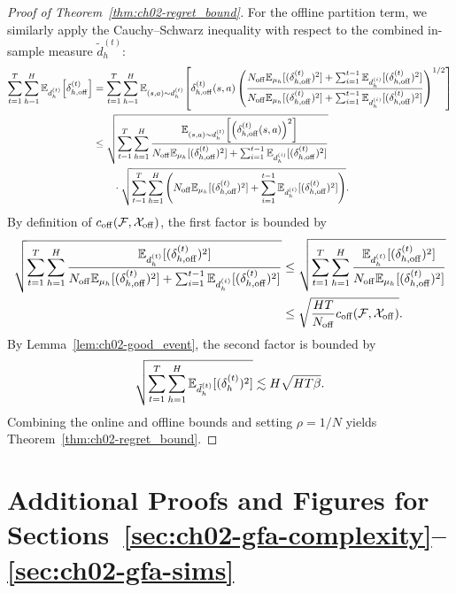 \begin{proof}[Proof of Theorem~\ref{thm:ch02-regret_bound}]
For the offline partition term, we similarly apply the Cauchy--Schwarz inequality with respect to the combined in-sample measure $\tilde{d}_h^{(t)}$:
\begin{align}
    \sum_{t = 1}^T \sum_{h=1}^H \mathbb{E}_{d_h^{(t)}} \!\left[\delta_{h, {\operatorname{off}}}^{(t)}\right]
    &= \sum_{t = 1}^T \sum_{h=1}^H \mathbb{E}_{(s, a) \sim d_h^{(t)}}\!\left[\delta_{h, {\operatorname{off}}}^{(t)}(s, a)\left(\frac{ N_{{\operatorname{off}}} \mathbb{E}_{\mu_{h}}[(\delta_{h, {\operatorname{off}}}^{(t)})^2] + \sum_{i=1}^{t-1}\mathbb{E}_{d_h^{(i)}}[(\delta_{h, {\operatorname{off}}}^{(t)})^2]}{ N_{{\operatorname{off}}} \mathbb{E}_{\mu_{h}}[(\delta_{h, {\operatorname{off}}}^{(t)})^2] + \sum_{i=1}^{t-1}\mathbb{E}_{d_h^{(i)}}[(\delta_{h, {\operatorname{off}}}^{(t)})^2]}\right)^{1 / 2}\right]  \nonumber\\
    &\leq \sqrt{\sum_{t = 1}^T \sum_{h=1}^H \frac{\mathbb{E}_{(s, a) \sim d_h^{(t)}}\!\left[\left( \delta_{h, {\operatorname{off}}}^{(t)}(s, a)\right)^2\right]}{ N_{{\operatorname{off}}} \mathbb{E}_{\mu_{h}}[(\delta_{h, {\operatorname{off}}}^{(t)})^2] + \sum_{i=1}^{t-1}\mathbb{E}_{d_h^{(i)}}[(\delta_{h, {\operatorname{off}}}^{(t)})^2]}} \nonumber\\
    &\qquad \cdot\sqrt{\sum_{t=1}^T \sum_{h=1}^H  \left(  N_{{\operatorname{off}}} \mathbb{E}_{\mu_{h}}[(\delta_{h, {\operatorname{off}}}^{(t)})^2] + \sum_{i=1}^{t-1}\mathbb{E}_{d_h^{(i)}}[(\delta_{h, {\operatorname{off}}}^{(t)})^2]\right)}.
\end{align}
By definition of $c_{{\operatorname{off}}}({\mathcal{F}}, {\mathcal{X}}_{{\operatorname{off}}})$, the first factor is bounded by
\begin{align}
    \sqrt{\sum_{t = 1}^T \sum_{h=1}^H \frac{\mathbb{E}_{d_h^{(t)}}[( \delta_{h, {\operatorname{off}}}^{(t)})^2]}{ N_{{\operatorname{off}}} \mathbb{E}_{\mu_{h}}[(\delta_{h, {\operatorname{off}}}^{(t)})^2] + \sum_{i=1}^{t-1}\mathbb{E}_{d_h^{(i)}}[(\delta_{h, {\operatorname{off}}}^{(t)})^2]}}
    &\leq \sqrt{\sum_{t=1}^T \sum_{h=1}^H \frac{\mathbb{E}_{d_h^{(t)}}[( \delta_{h, {\operatorname{off}}}^{(t)})^2]}{ N_{{\operatorname{off}}} \mathbb{E}_{\mu_{h}}[(\delta_{h, {\operatorname{off}}}^{(t)})^2]}}  \nonumber\\
    &\leq \sqrt{\frac{HT}{N_{{\operatorname{off}}}} c_{{\operatorname{off}}}({\mathcal{F}}, {\mathcal{X}}_{{\operatorname{off}}})}.
\end{align}
By Lemma~\ref{lem:ch02-good_event}, the second factor is bounded by
\begin{equation}
    \sqrt{\sum_{t=1}^T \sum_{h=1}^H \mathbb{E}_{\tilde{d}_h^{(t)}}[(\delta_h^{(t)})^2]} \lesssim H\sqrt{H T \beta}.
\end{equation}
Combining the online and offline bounds and setting $\rho = 1/N$ yields Theorem~\ref{thm:ch02-regret_bound}.
\end{proof}

\section{Additional Proofs and Figures for Sections~\ref{sec:ch02-gfa-complexity}--\ref{sec:ch02-gfa-sims}}
\label{app:ch02-sec_proofs}
\label{defn:ch02-DE_dim}
\label{lem:ch02-restricted-elliptic}
\label{lem:ch02-general_SEC}
\label{app:ch02-case_studies}
\label{app:ch02-general_case}
\label{app:ch02-experiments}
\label{fig:ch02-tabular-visits}
\label{fig:ch02-reward-tabular}
\label{fig:ch02-reward-linear}

